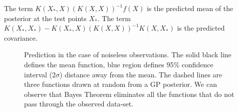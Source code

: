 The term \(K(X_{*}, X)( K(X, X) )^{-1}f(X)\) is the predicted mean of the posterior at the test points \(X_{*}\). The term \(K(X_{*}, X_{*}) - K(X_{*}, X)( K(X, X) )^{-1} K(X, X_{*})\) is the predicted covariance. 

\begin{figure}[!ht]
  \centering
    \quad
{}\quad
  
       \caption{Prediction in the case of noiseless observations. The solid black line defines the mean function, blue region defines 95\% confidence interval (2\(\sigma\)) distance away from the mean. The dashed lines are three functions drawn at random from a GP posterior. We can observe that Bayes Theorem eliminates all the functions that do not pass through the observed data-set.}
       \label{figGPNoiseLessPosteriors}
\end{figure}

